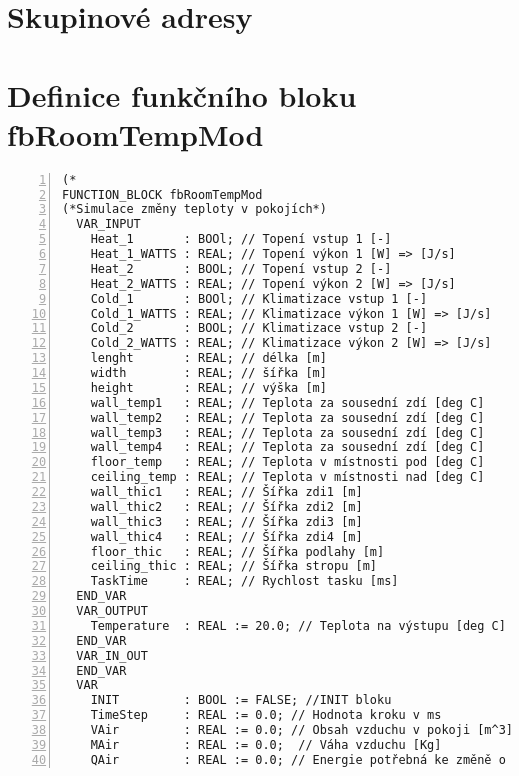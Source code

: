 \chapter{Skupinové adresy}
\label{apend:skupinove_adresy}




\chapter{Definice funkčního bloku fbRoomTempMod}
\label{apend:fbRoomTempMod}
\begin{lstlisting}[language=ST, breaklines=true, numbers=left, numberstyle=\small, numbersep=10pt, frame=single, basicstyle=\ttfamily\small, caption={Definice funkčního bloku fbRoomTempMod}, label={lst:fbRoomTempMod}]
(*
FUNCTION_BLOCK fbRoomTempMod
(*Simulace změny teploty v pokojích*)
  VAR_INPUT
    Heat_1       : BOOl; // Topení vstup 1 [-]
    Heat_1_WATTS : REAL; // Topení výkon 1 [W] => [J/s]
    Heat_2       : BOOL; // Topení vstup 2 [-]
    Heat_2_WATTS : REAL; // Topení výkon 2 [W] => [J/s]
    Cold_1       : BOOl; // Klimatizace vstup 1 [-]
    Cold_1_WATTS : REAL; // Klimatizace výkon 1 [W] => [J/s]
    Cold_2       : BOOL; // Klimatizace vstup 2 [-]
    Cold_2_WATTS : REAL; // Klimatizace výkon 2 [W] => [J/s]
    lenght       : REAL; // délka [m]
    width        : REAL; // šířka [m]
    height       : REAL; // výška [m]
    wall_temp1   : REAL; // Teplota za sousední zdí [deg C]
    wall_temp2   : REAL; // Teplota za sousední zdí [deg C]
    wall_temp3   : REAL; // Teplota za sousední zdí [deg C]
    wall_temp4   : REAL; // Teplota za sousední zdí [deg C]
    floor_temp   : REAL; // Teplota v místnosti pod [deg C]
    ceiling_temp : REAL; // Teplota v místnosti nad [deg C]
    wall_thic1   : REAL; // Šířka zdi1 [m]
    wall_thic2   : REAL; // Šířka zdi2 [m]
    wall_thic3   : REAL; // Šířka zdi3 [m]
    wall_thic4   : REAL; // Šířka zdi4 [m]
    floor_thic   : REAL; // Šířka podlahy [m]
    ceiling_thic : REAL; // Šířka stropu [m]
    TaskTime     : REAL; // Rychlost tasku [ms]
  END_VAR
  VAR_OUTPUT
    Temperature  : REAL := 20.0; // Teplota na výstupu [deg C]
  END_VAR
  VAR_IN_OUT
  END_VAR
  VAR
    INIT         : BOOL := FALSE; //INIT bloku
    TimeStep     : REAL := 0.0; // Hodnota kroku v ms
    VAir         : REAL := 0.0; // Obsah vzduchu v pokoji [m^3]
    MAir         : REAL := 0.0;  // Váha vzduchu [Kg]
    QAir         : REAL := 0.0; // Energie potřebná ke změně o 1deg C [J]

\end{lstlisting}
